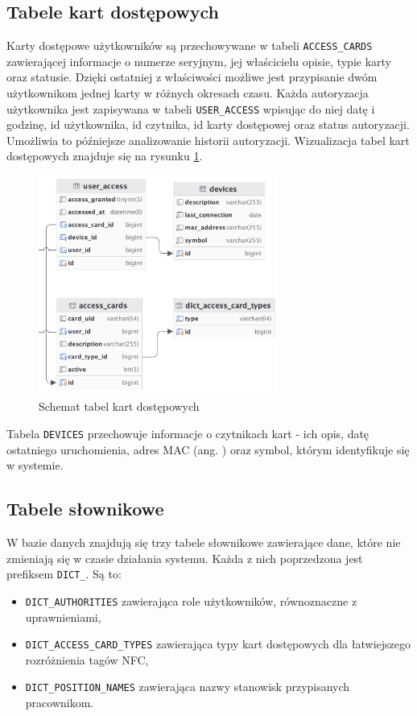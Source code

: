 \subsection{Tabele kart dostępowych}

Karty dostępowe użytkowników są przechowywane w tabeli \texttt{ACCESS\_CARDS} zawierającej informacje o numerze seryjnym, jej właścicielu opisie, typie karty oraz statusie. Dzięki ostatniej z właściwości możliwe jest przypisanie dwóm użytkownikom jednej karty w różnych okresach czasu. Każda autoryzacja użytkownika jest zapisywana w tabeli \texttt{USER\_ACCESS} wpisując do niej datę i godzinę, id użytkownika, id czytnika, id karty dostępowej oraz status autoryzacji. Umożliwia to późniejsze analizowanie historii autoryzacji. Wizualizacja tabel kart dostępowych znajduje się na rysunku \ref{fig:accessCardsTable}.

\begin{figure}[H]
    \centering
    \includegraphics[width=0.7\textwidth]{graf/acTable.png}
    \caption{Schemat tabel kart dostępowych}
    \label{fig:accessCardsTable}
\end{figure}

Tabela \texttt{DEVICES} przechowuje informacje o czytnikach kart - ich opis, datę ostatniego uruchomienia, adres MAC (ang. ) oraz symbol, którym identyfikuje się w systemie.

\subsection{Tabele słownikowe}

W bazie danych znajdują się trzy tabele słownikowe zawierające dane, które nie zmieniają się w czasie działania systemu. Każda z nich poprzedzona jest prefiksem \texttt{DICT\_}. Są to:
\begin{itemize}
    \item \texttt{DICT\_AUTHORITIES} zawierająca role użytkowników, równoznaczne z uprawnieniami,
    \item \texttt{DICT\_ACCESS\_CARD\_TYPES} zawierająca typy kart dostępowych dla łatwiejszego rozróżnienia tagów NFC,
    \item \texttt{DICT\_POSITION\_NAMES} zawierająca nazwy stanowisk przypisanych pracownikom.
\end{itemize}

